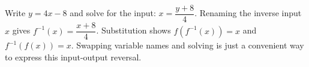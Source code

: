 Write $y=4x-8$ and solve for the input: $x=\dfrac{y+8}{4}$. Renaming the inverse input $x$ gives $\boxed{f^{-1}(x)=\dfrac{x+8}{4}}$. Substitution shows $f(f^{-1}(x))=x$ and $f^{-1}(f(x))=x$. Swapping variable names and solving is just a convenient way to express this input-output reversal.
